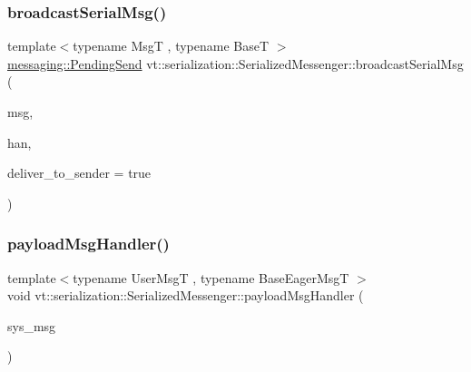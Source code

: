 \subsubsection{\texorpdfstring{broadcast\+Serial\+Msg()}{broadcastSerialMsg()}}
{\footnotesize\ttfamily template$<$typename MsgT , typename BaseT $>$ \\
\hyperlink{structvt_1_1messaging_1_1_pending_send}{messaging\+::\+Pending\+Send} vt\+::serialization\+::\+Serialized\+Messenger\+::broadcast\+Serial\+Msg (\begin{DoxyParamCaption}\item[{MsgT $\ast$}]{msg,  }\item[{\hyperlink{namespacevt_af64846b57dfcaf104da3ef6967917573}{Handler\+Type}}]{han,  }\item[{bool}]{deliver\+\_\+to\+\_\+sender = {\ttfamily true} }\end{DoxyParamCaption})\hspace{0.3cm}{\ttfamily [static]}}

\mbox{\label{structvt_1_1serialization_1_1_serialized_messenger_adef4a4664f9eab8eca28304871540791}} 
\subsubsection{\texorpdfstring{payload\+Msg\+Handler()}{payloadMsgHandler()}}
{\footnotesize\ttfamily template$<$typename User\+MsgT , typename Base\+Eager\+MsgT $>$ \\
void vt\+::serialization\+::\+Serialized\+Messenger\+::payload\+Msg\+Handler (\begin{DoxyParamCaption}\item[{\hyperlink{namespacevt_1_1serialization_af3a0dfd4a0d3fa09c75edba0dc1b7fec}{Serial\+Eager\+Payload\+Msg}$<$ User\+MsgT, Base\+Eager\+MsgT $>$ $\ast$}]{sys\+\_\+msg }\end{DoxyParamCaption})\hspace{0.3cm}{\ttfamily [static]}}

\mbox{\label{structvt_1_1serialization_1_1_serialized_messenger_a2e9c1f9f5c6923f8ad3467e62542f5ab}} 
